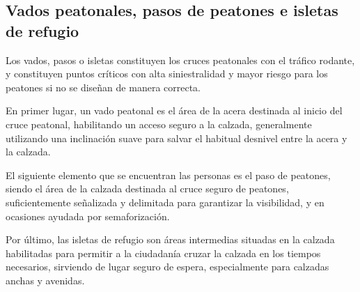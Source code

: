         {}

\parametroclave{\porrellenar}

\subsection{Vados peatonales, pasos de peatones e isletas de refugio}
\label{subsec:vados}

Los vados, pasos o isletas constituyen los cruces peatonales con el tráfico rodante, y constituyen puntos críticos con alta siniestralidad y mayor riesgo para los peatones si no se diseñan de manera correcta.

En primer lugar, un vado peatonal es el área de la acera destinada al inicio del cruce peatonal, habilitando un acceso seguro a la calzada, generalmente utilizando una inclinación suave para salvar el habitual desnivel entre la acera y la calzada.

El siguiente elemento que se encuentran las personas es el paso de peatones, siendo el área de la calzada destinada al cruce seguro de peatones, suficientemente señalizada y delimitada para garantizar la visibilidad, y en ocasiones ayudada por semaforización.

Por último, las isletas de refugio son áreas intermedias situadas en la calzada habilitadas para permitir a la ciudadanía cruzar la calzada en los tiempos necesarios, sirviendo de lugar seguro de espera, especialmente para calzadas anchas y avenidas.

